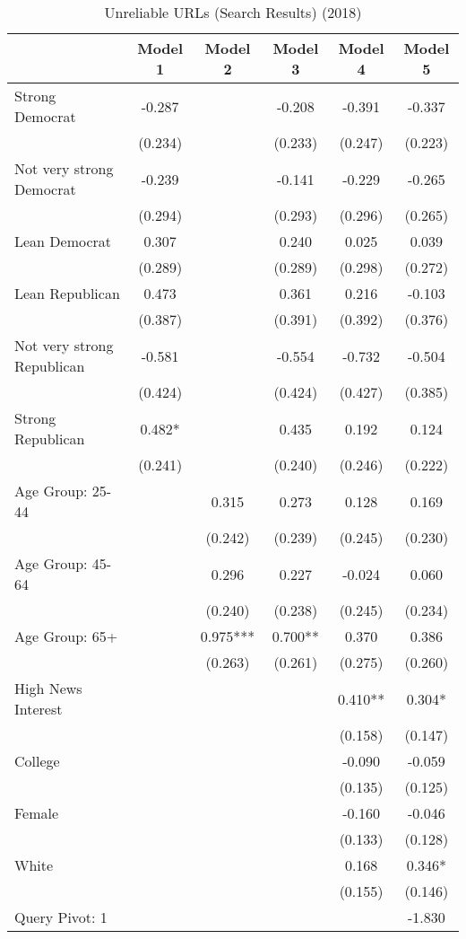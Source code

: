 \begin{table}

\caption{Unreliable URLs (Search Results) (2018)}
\centering
\begin{tabular}[t]{lccccc}
\toprule
  & Model 1 & Model 2 & Model 3 & Model 4 & Model 5\\
\midrule
Strong Democrat & -0.287 &  & -0.208 & -0.391 & -0.337\\
 & (0.234) &  & (0.233) & (0.247) & (0.223)\\
Not very strong Democrat & -0.239 &  & -0.141 & -0.229 & -0.265\\
 & (0.294) &  & (0.293) & (0.296) & (0.265)\\
Lean Democrat & 0.307 &  & 0.240 & 0.025 & 0.039\\
 & (0.289) &  & (0.289) & (0.298) & (0.272)\\
Lean Republican & 0.473 &  & 0.361 & 0.216 & -0.103\\
 & (0.387) &  & (0.391) & (0.392) & (0.376)\\
Not very strong Republican & -0.581 &  & -0.554 & -0.732 & -0.504\\
 & (0.424) &  & (0.424) & (0.427) & (0.385)\\
Strong Republican & 0.482* &  & 0.435 & 0.192 & 0.124\\
 & (0.241) &  & (0.240) & (0.246) & (0.222)\\
Age Group: 25-44 &  & 0.315 & 0.273 & 0.128 & 0.169\\
 &  & (0.242) & (0.239) & (0.245) & (0.230)\\
Age Group: 45-64 &  & 0.296 & 0.227 & -0.024 & 0.060\\
 &  & (0.240) & (0.238) & (0.245) & (0.234)\\
Age Group: 65+ &  & 0.975*** & 0.700** & 0.370 & 0.386\\
 &  & (0.263) & (0.261) & (0.275) & (0.260)\\
High News Interest &  &  &  & 0.410** & 0.304*\\
 &  &  &  & (0.158) & (0.147)\\
College &  &  &  & -0.090 & -0.059\\
 &  &  &  & (0.135) & (0.125)\\
Female &  &  &  & -0.160 & -0.046\\
 &  &  &  & (0.133) & (0.128)\\
White &  &  &  & 0.168 & 0.346*\\
 &  &  &  & (0.155) & (0.146)\\
Query Pivot: 1 &  &  &  &  & -1.830\\

\end{tabular}
\end{table}
